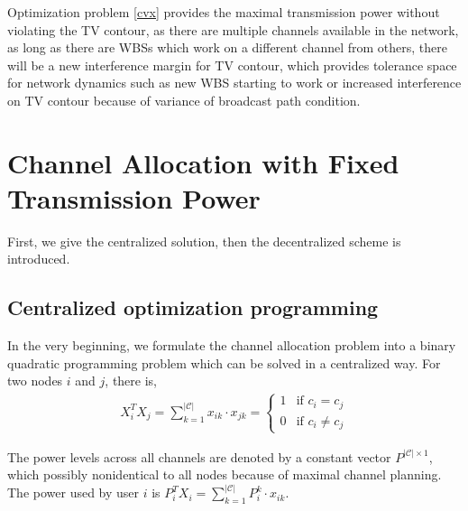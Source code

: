 Optimization problem \ref{cvx} provides the maximal transmission power without violating the TV contour, as there are multiple channels available in the network, as long as there are WBSs which work on a different channel from others, there will be a new interference margin for TV contour, which provides tolerance space for network dynamics such as new WBS starting to work or increased interference on TV contour because of variance of broadcast path condition. 


\section{Channel Allocation with Fixed Transmission Power}
\label{CA_fixedPower_2subproblem}
First, we give the centralized solution, then the decentralized scheme is introduced.
\subsection{Centralized optimization programming}
In the very beginning, we formulate the channel allocation problem into a binary quadratic programming problem which can be solved in a centralized way.  For two nodes $i$ and $j$, there is,
\begin{equation}
\begin{split}
X_i^TX_j = \sum\limits_{k=1}^{|\mathcal{C}|}x_{ik}\cdot x_{jk} = 
\left\{ \begin{array}{ll}
1 & \mbox{if $c_i=c_j$} \\
0 & \mbox{if $c_i\neq c_j$} 
\end{array}
\right.
\end{split}
\end{equation}

The power levels across all channels are denoted by a constant vector $P^{|\mathcal{C}|\times 1}$, which possibly nonidentical to all nodes because of maximal channel planning. The power used by user $i$ is $P_i^TX_i = \sum\limits_{k=1}^{|\mathcal{C}|}P_{i}^k\cdot x_{ik}$.


